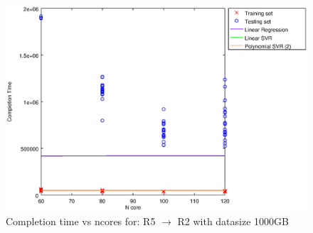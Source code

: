 
\begin {figure}[hbtp]
\centering
\includegraphics[width=\textwidth]{output/R5_R2_1000_ALL_FEATURES/plot_R5_R2_1000_bestmodels.eps}
\caption{Completion time vs ncores for: R5 $\rightarrow$ R2 with datasize 1000GB}
\label{fig:coreonly_linear_R5_R2_1000}
\end {figure}
